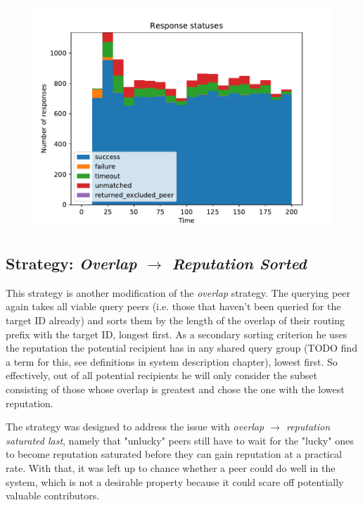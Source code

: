 \begin{figure}[t]
\centering
\includegraphics[width=1\columnwidth]{figures/selection_overlap_high_rep_last_resp_statuses}
\label{fig:selection_overlap_high_rep_last_resp_statuses}
\end{figure}

\subsection{Strategy: \emph{Overlap $\rightarrow$ Reputation Sorted}}
\label{sec:rep_avail_selection_overlap_rep_sorted}
This strategy is another modification of the \emph{overlap} strategy. The
querying peer again takes all viable query peers (i.e. those that haven't been
queried for the target ID already) and sorts them by the length of the overlap
of their routing prefix with the target ID, longest first. As a secondary
sorting criterion he uses the reputation the potential recipient has in any
shared query group (TODO find a term for this, see definitions in system
description chapter), lowest first. So effectively, out of all potential
recipients he will only consider the subset consisting of those whose overlap is
greatest and chose the one with the lowest reputation.

The strategy was designed to address the issue with \emph{overlap $\rightarrow$
reputation saturated last}, namely that "unlucky" peers still have to wait for
the "lucky" ones to become reputation saturated before they can gain reputation
at a practical rate. With that, it was left up to chance whether a peer could do
well in the system, which is not a desirable property because it could scare off
potentially valuable contributors.

